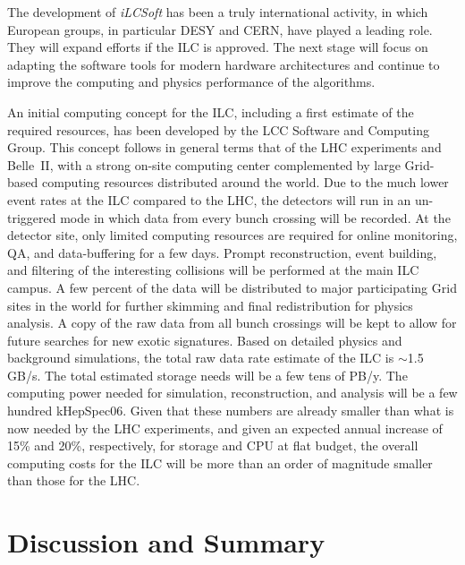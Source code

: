 \documentclass[%
 reprint,
 amsmath,amssymb,
 aps,
]{revtex4-1}
\newcommand{\todo}[1]{\textcolor{red}{{#1}}}
\begin{document}
The development of \emph{iLCSoft} has been 
 a truly international activity, in which European groups, in particular DESY and
CERN, have played a leading role.  They 
will expand efforts if the ILC is approved.  The next stage
will 
focus on adapting the software tools for
 modern hardware architectures and continue to
improve the computing and physics performance of the algorithms.


An initial computing concept for the ILC, including a first estimate of the required resources, has been developed by the LCC Software and Computing Group.
This concept follows in general terms that of the LHC experiments and
Belle~II,  with a strong on-site computing center complemented by large
Grid-based computing resources distributed around the world. Due to the much lower event rates at the ILC compared to the LHC, 
the detectors will run in an un-triggered mode in which  data from every bunch crossing will be recorded. At the detector site,  only limited computing
resources are required for online monitoring, QA, and data-buffering for a few
days.
 Prompt reconstruction, event building, and filtering of the interesting collisions
will be performed at the main ILC campus.
A few percent of the data will be distributed to major participating Grid sites
in the world for further skimming and final redistribution for physics
analysis. A copy of the raw data from all bunch crossings will be kept
to allow
 for future searches for new exotic signatures. 
Based on detailed physics and background simulations,
 the total raw data rate estimate of the ILC is $\sim$1.5 GB/s.
The total estimated storage needs will be a few tens of PB/y.
The computing power needed for simulation, reconstruction, and analysis will be a few hundred kHepSpec06.
Given that these numbers are already smaller than what is now
needed by the LHC experiments, and given an expected annual increase
of 15\% and 20\%, respectively, for storage and CPU
at flat budget, the overall computing costs for the ILC
will be more than an order of magnitude smaller than those for the LHC.

\vspace{-.4cm}

\section{\label{sec:discuss}Discussion and Summary}

\vspace{-.3cm}

\end{document}
